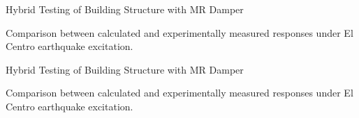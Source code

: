 \documentclass[usepdftitle=false]{beamer}
\begin{document}
\begin{frame}{Hybrid Testing of Building Structure with MR Damper}
\begin{figure}[H]
\centering
\setcounter{subfigure}{0}
\label{fig:8-9}
\end{figure}
Comparison between calculated and experimentally measured responses under El Centro earthquake excitation.
\end{frame}


\begin{frame}{Hybrid Testing of Building Structure with MR Damper}
\begin{figure}[H]
\centering
{}
\label{fig:8-9}
\end{figure}
Comparison between calculated and experimentally measured responses under El Centro earthquake excitation.
\end{frame}
\end{document}
